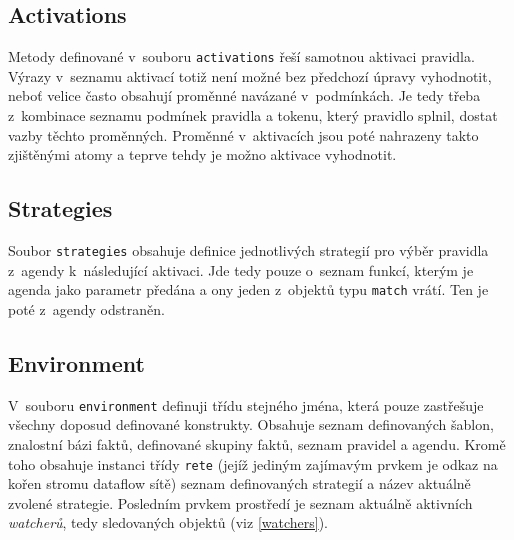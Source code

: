 \subsection{Activations}
Metody definované v~souboru \verb|activations| řeší samotnou aktivaci pravidla.
Výrazy v~seznamu aktivací totiž není možné bez předchozí úpravy vyhodnotit,
neboť velice často obsahují proměnné navázané v~podmínkách. Je tedy třeba
z~kombinace seznamu podmínek pravidla a tokenu, který pravidlo splnil, dostat
vazby těchto proměnných. Proměnné v~aktivacích jsou poté nahrazeny takto
zjištěnými atomy a teprve tehdy je možno aktivace vyhodnotit.
\subsection{Strategies}
Soubor \verb|strategies| obsahuje definice jednotlivých strategií pro výběr
pravidla z~agendy k~následující aktivaci. Jde tedy pouze o~seznam funkcí,
kterým je agenda jako parametr předána a ony jeden z~objektů typu \verb|match|
vrátí. Ten je poté z~agendy odstraněn.
\subsection{Environment}
V~souboru \verb|environment| definuji třídu stejného jména, která pouze
zastřešuje všechny doposud definované konstrukty. Obsahuje seznam definovaných
šablon, znalostní bázi faktů, definované skupiny faktů, seznam pravidel
a agendu. Kromě toho obsahuje instanci třídy \verb|rete| (jejíž jediným
zajímavým prvkem je odkaz na kořen stromu dataflow sítě) seznam definovaných
strategií a název aktuálně zvolené strategie. Posledním prvkem prostředí
je seznam aktuálně aktivních \emph{watcherů}, tedy sledovaných objektů
(viz \ref{watchers}).

